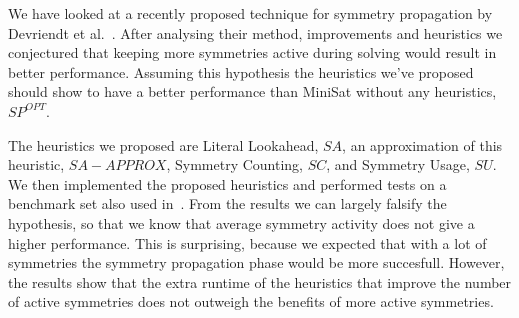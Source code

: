 We have looked at a recently proposed technique for symmetry propagation by Devriendt et al.~\cite{devriendt2012symmetry}.
After analysing their method, improvements and heuristics we conjectured that
keeping more symmetries active during solving would result in better performance.
Assuming this hypothesis the heuristics we've proposed should show to have a better performance than
MiniSat without any heuristics, $SP^{OPT}$.

The heuristics we proposed are Literal Lookahead, $SA$, an approximation of this heuristic, $SA-APPROX$,
Symmetry Counting, $SC$, and Symmetry Usage, $SU$.
We then implemented the proposed heuristics and performed tests on a benchmark set also used in~\cite{devriendt2012symmetry}.
From the results we can largely falsify the hypothesis,
so that we know that average symmetry activity does not give a higher performance.
This is surprising, because we expected that with a lot of symmetries the symmetry propagation phase would be more succesfull.
However, the results show that the extra runtime of the heuristics
that improve the number of active symmetries does not outweigh the benefits of more active symmetries.